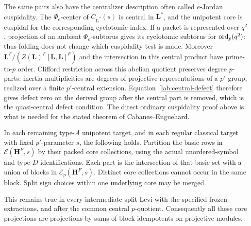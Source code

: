 \begin{remark}\label{lab:jordan-cuspidal}
The same pairs also have the centralizer description often
called $e$-Jordan cuspidality.  The $\Phi_e$-center of
$C_{\mathbf L^*}(s)$ is central in $\mathbf L^*$, and the
unipotent core is cuspidal for the corresponding cyclotomic
index.  If a packet is represented over $q^2$, projection of
an ambient $\Phi_e$-subtorus gives its cyclotomic subtorus
for $\operatorname{ord}_p(q^2)$; thus folding does not change which
cuspidality test is made.  Moreover
$\mathbf L^F/(Z(\mathbf L)^F[\mathbf L,\mathbf L]^F)$
and the intersection in this central product have
prime-to-$p$ order.  Clifford restriction across this
abelian quotient preserves degree $p$-parts: inertia
multiplicities are degrees of projective representations
of a $p'$-group, realized over a finite $p'$-central
extension.  Equation~\eqref{lab:central-defect} therefore
gives defect zero on the derived group after the central
part is removed, which is the quasi-central defect
condition.  The direct ordinary cuspidality proof above
is what is needed for the stated theorem of Cabanes--Enguehard.
\end{remark}

\begin{proposition}\label{prop:core-blocks}
In each remaining type-$A$ unipotent target, and in each
regular classical target with fixed $p'$-parameter $s$,
the following holds.  Partition the basic rows in
$\mathcal E(\mathbf H^F,s)$ by their packed core
collections, using the actual unordered-symbol and
type-$D$ identifications.  Each part is the intersection
of that basic set with a union of blocks in
$\mathcal E_p(\mathbf H^F,s)$.  Distinct core collections
cannot occur in the same block.  Split sign choices
within one underlying core may be merged.

This remains true in every intermediate split Levi with
the specified frozen extractions, and after the common
central $p$-quotient.  Consequently all these core
projections are projections by sums of block idempotents
on projective modules.
\end{proposition}

